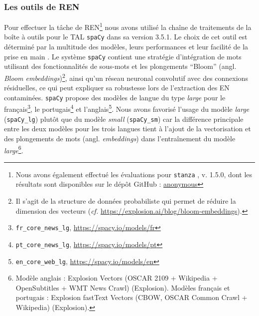 \subsubsection{Les outils de REN}
Pour effectuer la tâche de REN\footnote{Nous avons également effectué les évaluations pour \texttt{stanza} \cite{qi2020stanza}, v. 1.5.0, dont les résultats sont disponibles sur le dépôt GitHub : \url{anonymous}} nous avons utilisé la chaîne de traitements de la boîte à outils pour le TAL \texttt{spaCy} dans sa version 3.5.1. Le choix de cet outil est déterminé par la multitude des modèles, leurs performances et leur facilité de la prise en main \cite{DBLP:conf/gis/Koudoro-Parfait21}. %
Le système \texttt{spaCy} contient une stratégie d'intégration de mots utilisant des fonctionnalités de sous-mots et les plongements ``Bloom'' (angl. \textit{Bloom embeddings})\footnote{Il s'agit de la structure de données probabiliste qui permet de réduire la dimension des vecteurs (\textit{cf.} \url{https://explosion.ai/blog/bloom-embeddings}).}, ainsi qu'un réseau neuronal convolutif avec des connexions résiduelles, ce qui peut expliquer sa robustesse lors de l'extraction des EN contaminées. \texttt{spaCy} propose des modèles de langue du type \textit{large} pour le français\footnote{\texttt{fr\_core\_news\_lg}, \url{https://spacy.io/models/fr}}, le portugais\footnote{\texttt{pt\_core\_news\_lg}, \url{https://spacy.io/models/pt}} et l'anglais\footnote{\texttt{en\_core\_web\_lg}, \url{https://spacy.io/models/en}}. Nous avons favorisé l'usage du modèle \textit{large} (\texttt{spaCy\_lg}) plutôt que du modèle \textit{small} (\texttt{spaCy\_sm}) car la différence principale entre les deux modèles pour les trois langues tient à l'ajout de la vectorisation et des plongements de mots (angl. \textit{embeddings}) dans l'entraînement du modèle \textit{large}\footnote{Modèle anglais : Explosion Vectors (OSCAR 2109 + Wikipedia + OpenSubtitles + WMT News Crawl) (Explosion). Modèles français et portugais :
Explosion fastText Vectors (CBOW, OSCAR Common Crawl + Wikipedia) (Explosion).}.



